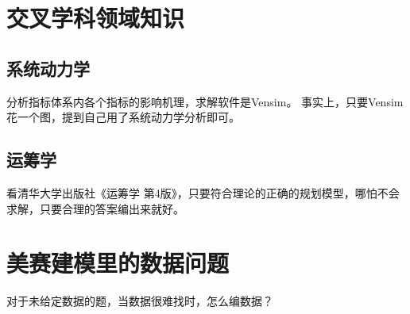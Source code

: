 \documentclass[11pt,a4paper]{article}
\begin{document}
\section{交叉学科领域知识}
\subsection{系统动力学}
分析指标体系内各个指标的影响机理，求解软件是Vensim。
事实上，只要Vensim花一个图，提到自己用了系统动力学分析即可。
\subsection{运筹学}
看清华大学出版社《运筹学 第4版》，只要符合理论的正确的规划模型，哪怕不会求解，只要合理的答案编出来就好。
\section{美赛建模里的数据问题}
对于未给定数据的题，当数据很难找时，怎么编数据？
\end{document}
